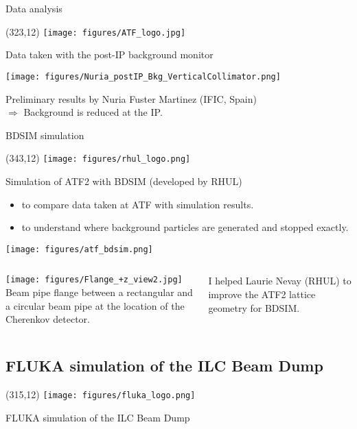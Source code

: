 \documentclass[xcolor={dvipsnames}]{beamer}
\newcommand{\flukalogo}{
  \setlength{\TPHorizModule}{1pt}
  \setlength{\TPVertModule}{1pt}
  \begin{textblock}{1}(315,12)
   \texttt{[image: figures/fluka\_logo.png]}
  \end{textblock}
}
\newcommand{\ATFlogo}{
  \setlength{\TPHorizModule}{1pt}
  \setlength{\TPVertModule}{1pt}
  \begin{textblock}{1}(323,12)
   \texttt{[image: figures/ATF\_logo.jpg]}
  \end{textblock}
}
\newcommand{\rhullogo}{
  \setlength{\TPHorizModule}{1pt}
  \setlength{\TPVertModule}{1pt}
  \begin{textblock}{1}(343,12)
   \texttt{[image: figures/rhul\_logo.png]}
  \end{textblock}
}
\begin{document}
\begin{frame}{Data analysis}
\ATFlogo
Data taken with the post-IP background monitor\\
\vspace*{0.3cm}
\begin{center}
  \texttt{[image: figures/Nuria\_postIP\_Bkg\_VerticalCollimator.png]}\\
\end{center}
Preliminary results by Nuria Fuster Martinez (IFIC, Spain)\\
\Large{$\Rightarrow$ Background is reduced at the IP.}
\end{frame}

\begin{frame}{BDSIM simulation}
\rhullogo
Simulation of ATF2 with BDSIM (developed by RHUL)\\
\begin{itemize}
 \item to compare data taken at ATF with simulation results.
 \item to understand where background particles are generated and stopped exactly.
\end{itemize}

\begin{center}
  \texttt{[image: figures/atf\_bdsim.png]}\\
\end{center}

\begin{columns}
 \begin{column}[c]{0.5\textwidth}
 \centering
\texttt{[image: figures/Flange\_+z\_view2.jpg]}\\
\tiny{Beam pipe flange between a rectangular and a circular beam pipe at the location of the Cherenkov detector.}
 \end{column}
 \begin{column}[c]{0.5\textwidth}
I helped Laurie Nevay (RHUL) to improve the ATF2 lattice geometry for BDSIM.
 \end{column}
 \end{columns}
\end{frame}

\subsection{FLUKA simulation of the ILC Beam Dump}
\begin{frame}
 \flukalogo
 \begin{center}
    \LARGE FLUKA simulation of the ILC Beam Dump
 \end{center}
\end{frame}

\end{document}
